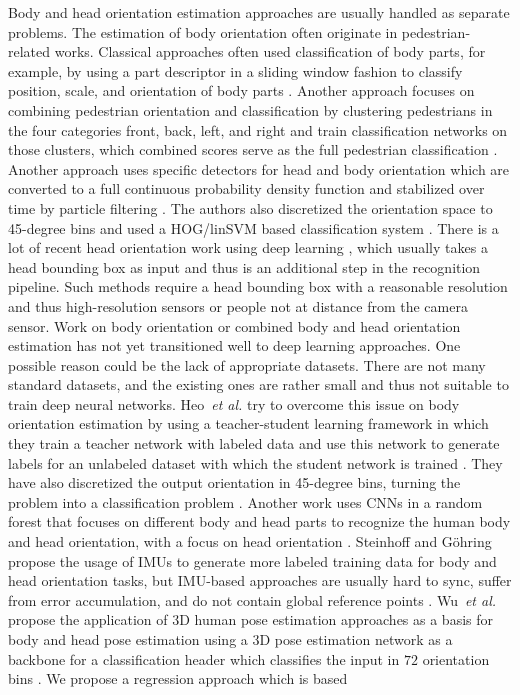 \documentclass[a4paper, 10pt, conference]{ieeeconf}
\begin{document}
Body and head orientation estimation approaches are usually handled as separate problems. The estimation of body orientation often originate in pedestrian-related works. Classical approaches often used classification of body parts, for example, by using a part descriptor in a sliding window fashion to classify position, scale, and orientation of body parts \cite{andrilukaPictorialStructuresRevisited2009}. Another approach focuses on combining pedestrian orientation and classification by clustering pedestrians in the four categories front, back, left, and right and train classification networks on those clusters, which combined scores serve as the full pedestrian classification \cite{enzweilerIntegratedPedestrianClassification2010}. Another approach uses specific detectors for head and body orientation which are converted to a full continuous probability density function and stabilized over time by particle filtering \cite{flohrJointProbabilisticPedestrian2014,flohrProbabilisticFrameworkJoint2015}. The authors also discretized the orientation space to 45-degree bins and used a HOG/linSVM based classification system \cite{flohrJointProbabilisticPedestrian2014}. There is a lot of recent head orientation work using deep learning \cite{guptaNoseEyesEars2019,ruizFineGrainedHeadPose2018,panSelfPacedDeepRegression2020,huDeepConvolutionalNeural2021,valleMultitaskHeadPose2020,xiaEfficientMultitaskNeural2021}, which usually takes a head bounding box as input and thus is an additional step in the recognition pipeline. Such methods require a head bounding box with a reasonable resolution and thus high-resolution sensors or people not at distance from the camera sensor. Work on body orientation or combined body and head orientation estimation has not yet transitioned well to deep learning approaches. One possible reason could be the lack of appropriate datasets. There are not many standard datasets, and the existing ones are rather small and thus not suitable to train deep neural networks. Heo~\textit{et al.} try to overcome this issue on body orientation estimation by using a teacher-student learning framework in which they train a teacher network with labeled data and use this network to generate labels for an unlabeled dataset with which the student network is trained \cite{heoEstimationPedestrianPose2019}. They have also discretized the output orientation in 45-degree bins, turning the problem into a classification problem \cite{heoEstimationPedestrianPose2019}. Another work uses CNNs in a random forest that focuses on different body and head parts to recognize the human body and head orientation, with a focus on head orientation \cite{leeHeadBodyOrientation2019}. Steinhoff and Göhring propose the usage of IMUs to generate more labeled training data for body and head orientation tasks, but IMU-based approaches are usually hard to sync, suffer from error accumulation, and do not contain global reference points \cite{steinhoffPedestrianHeadBody2020}. Wu~\textit{et al.} propose the application of 3D human pose estimation approaches as a basis for body and head pose estimation using a 3D pose estimation network as a backbone for a classification header which classifies the input in $72$ orientation bins \cite{wuMEBOWMonocularEstimation2020}. We propose a regression approach which is based 
\end{document}
